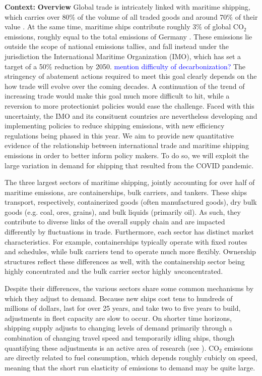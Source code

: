 \documentclass[hidelinks, 12pt,letterpaper]{article}
\begin{document}
\noindent \textbf{Context:} 
\textbf{Overview}
Global trade is intricately linked with maritime shipping, which carries over 80\% of the volume of all traded goods and around 70\% of their value \citep{unctad2017review}. 
At the same time, maritime ships contribute roughly 3\% of global CO$_2$ emissions, roughly equal to the total emissions of Germany \citep*{faber2020fourth}. These emissions lie outside the scope of national emissions tallies, and fall instead under the jurisdiction the International Maritime Organization (IMO), which has set a target of a 50\% reduction by 2050.
\textcolor{blue}{mention difficulty of decarbonization?}
The stringency of abatement actions required to meet this goal clearly depends on the how trade will evolve over the coming decades. A continuation of the trend of increasing trade would make this goal much more difficult to hit, while a reversion to more protectionist policies would ease the challenge. Faced with this uncertainty, the IMO and its consituent countries are nevertheless developing and implementing policies to reduce shipping emissions, with new efficiency regulations being phased in this year. We aim to provide new quantitative evidence of the relationship between international trade and maritime shipping emissions in order to better inform policy makers. To do so, we will exploit the large variation in demand for shipping that resulted from the COVID pandemic.

The three largest sectors of maritime shipping, jointly accounting for over half of maritime emissions, are containerships, bulk carriers, and tankers. These ships transport, respectively,  containerized goods (often manufactured goods), dry bulk goods (e.g. coal, ores, grains), and bulk liquids (primarily oil). As such, they contribute to diverse links of the overall supply chain and are impacted differently by fluctuations in trade. Furthermore, each sector has distinct market characteristics. For example, containerships typically operate with fixed routes and schedules, while bulk carriers tend to operate much more flexibly. Ownership structures reflect these differences as well, with the containership sector being highly concentrated and the bulk carrier sector highly \textit{un}concentrated.

Despite their differences, the various sectors share some common mechanisms by which they adjust to demand. Because new ships cost tens to hundreds of millions of dollars, last for over 25 years, and take two to five years to build, adjustments in fleet capacity are slow to occur. On shorter time horizons, shipping supply adjusts to changing levels of demand primarily through a combination of changing travel speed and temporarily idling ships, though quantifying these adjustments is an active area of research (see \citet*{adland2018dynamic, ollila2022effect,assmann2015missing}). CO$_2$ emissions are directly related to fuel consumption, which depends roughly cubicly on speed, meaning that the short run elasticity of emissions to demand may be quite large. 
\end{document}
